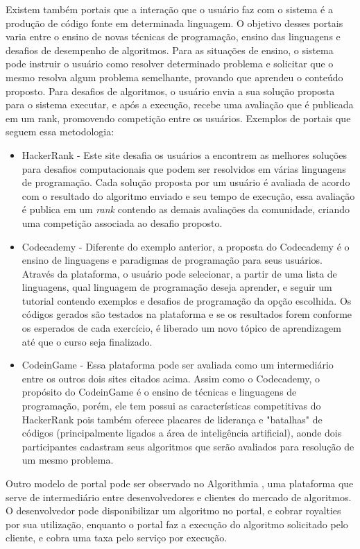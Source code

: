 \documentclass[tg]{mdtufsm}
\begin{document}
Existem também portais que a interação que o usuário faz com o sistema é a produção de código fonte em determinada linguagem. O objetivo desses portais varia entre o ensino de novas técnicas de programação, ensino das linguagens e desafios de desempenho de algoritmos. Para as situações de ensino, o sistema pode instruir o usuário como resolver determinado problema e solicitar que o mesmo resolva algum problema semelhante, provando que aprendeu o conteúdo proposto.
Para desafios de algoritmos, o usuário envia a sua solução proposta para o sistema executar, e após a execução, recebe uma avaliação que é publicada em um rank, promovendo competição entre os usuários. 
Exemplos de portais que seguem essa metodologia:
\begin{itemize}
	\item HackerRank \cite{hackerrank} - Este site desafia os usuários a encontrem as melhores soluções para desafios computacionais que podem ser resolvidos em várias linguagens de programação. Cada solução proposta por um usuário é avaliada de acordo com o resultado do algoritmo enviado e seu tempo de execução, essa avaliação é publica em um \emph{rank} contendo as demais avaliações da comunidade, criando uma competição associada ao desafio proposto.
	\item Codecademy \cite{codecademy} - Diferente do exemplo anterior, a proposta do Codecademy é o ensino de linguagens e paradigmas de programação para seus usuários. Através da plataforma, o usuário pode selecionar, a partir de uma lista de linguagens, qual linguagem de programação deseja aprender, e seguir um tutorial contendo exemplos e desafios de programação da opção escolhida.
	Os códigos gerados são testados na plataforma e se os resultados forem conforme os esperados de cada exercício, é liberado um novo tópico de aprendizagem até que o curso seja finalizado.
	\item CodeinGame \cite{codeingame} - Essa plataforma pode ser avaliada como um intermediário entre os outros dois sites citados acima. Assim como o Codecademy, o propósito do CodeinGame é o ensino de técnicas e linguagens de programação, porém, ele tem possui as características competitivas do HackerRank pois também oferece placares de liderança e "batalhas" de códigos (principalmente ligados a área de inteligência artificial), aonde dois participantes cadastram seus algoritmos que serão avaliados para resolução de um mesmo problema.
\end{itemize}

Outro modelo de portal pode ser observado no Algorithmia \cite{algor}, uma plataforma que serve de intermediário entre desenvolvedores e clientes do mercado de algoritmos. O desenvolvedor pode disponibilizar um algoritmo no portal, e cobrar royalties por sua utilização, enquanto o portal faz a execução do algoritmo solicitado pelo cliente, e cobra uma taxa pelo serviço por execução.
\end{document}
